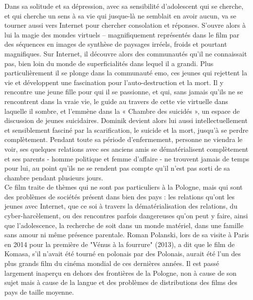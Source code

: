 \documentclass[12pt]{amsart}
\begin{document}
\begin{multicols}{2}
Dans sa solitude et sa dépression, avec sa sensibilité d’adolescent qui se cherche, et qui cherche un sens à sa vie qui jusque-là ne semblait en avoir aucun, va se tourner aussi vers Internet pour chercher consolation et réponses. S’ouvre alors à lui la magie des mondes virtuels – magnifiquement représentés dans le film par des séquences en images de synthèse de paysages irréels, froids et pourtant magnifiques. Sur Internet, il découvre alors des communautés qu’il ne connaissait pas, bien loin du monde de superficialités dans lequel il a grandi. Plus particulièrement il se plonge dans la communauté emo, ces jeunes qui rejettent la vie et développent une fascination pour l’auto-destruction et la mort. Il y rencontre une jeune fille pour qui il se passionne, et qui, sans jamais qu’ils ne se rencontrent dans la vraie vie, le guide au travers de cette vie virtuelle dans laquelle il sombre, et l’emmène dans la « Chambre des suicidés », un espace de discussion de jeunes suicidaires. Dominik devient alors lui aussi intellectuellement et sensiblement fasciné par la scarification, le suicide et la mort, jusqu’à se perdre complètement. Pendant toute sa période d'enfermement, personne ne viendra le voir, ses quelques relations avec ses anciens amis se dématérialisent complètement et ses parents - homme politique et femme d'affaire - ne trouvent jamais de temps pour lui, au point qu'ils ne se rendent pas compte qu'il n'est pas sorti de sa chambre pendant plusieurs jours. \\
Ce film traite de thèmes qui ne sont pas particuliers à la Pologne, mais qui sont des problèmes de sociétés présent dans bien des pays : les relations qu'ont les jeunes avec Internet, que ce soi à travers la dématérialisation des relations, du cyber-harcèlement, ou des rencontres parfois dangereuses qu'on peut y faire, ainsi que l'adolescence, la recherche de soit dans un monde matériel, dans une famille sans amour ni même présence parentale. Roman Polanski, lors de sa visite à Paris en 2014 pour la première de "Vénus à la fourrure" (2013), a dit que le film de Komasa, s'il n'avait été tourné en polonais par des Polonais, aurait été l'un des plus grands film du cinéma mondial de ces dernières années. Il est passé largement inaperçu en dehors des frontières de la Pologne, non à cause de son sujet mais à cause de la langue et des problèmes de distributions des films des pays de taille moyenne. 
\clearpage

\end{multicols}
\end{document}
